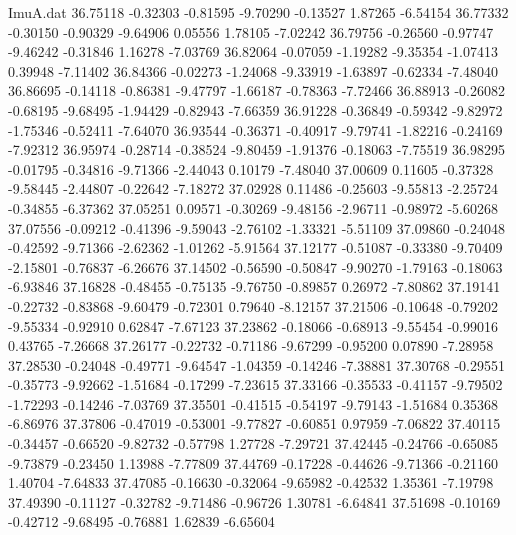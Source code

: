 \begin{filecontents}{ImuA.dat}
  36.75118   -0.32303   -0.81595   -9.70290   -0.13527    1.87265   -6.54154
  36.77332   -0.30150   -0.90329   -9.64906    0.05556    1.78105   -7.02242
  36.79756   -0.26560   -0.97747   -9.46242   -0.31846    1.16278   -7.03769
  36.82064   -0.07059   -1.19282   -9.35354   -1.07413    0.39948   -7.11402
  36.84366   -0.02273   -1.24068   -9.33919   -1.63897   -0.62334   -7.48040
  36.86695   -0.14118   -0.86381   -9.47797   -1.66187   -0.78363   -7.72466
  36.88913   -0.26082   -0.68195   -9.68495   -1.94429   -0.82943   -7.66359
  36.91228   -0.36849   -0.59342   -9.82972   -1.75346   -0.52411   -7.64070
  36.93544   -0.36371   -0.40917   -9.79741   -1.82216   -0.24169   -7.92312
  36.95974   -0.28714   -0.38524   -9.80459   -1.91376   -0.18063   -7.75519
  36.98295   -0.01795   -0.34816   -9.71366   -2.44043    0.10179   -7.48040
  37.00609    0.11605   -0.37328   -9.58445   -2.44807   -0.22642   -7.18272
  37.02928    0.11486   -0.25603   -9.55813   -2.25724   -0.34855   -6.37362
  37.05251    0.09571   -0.30269   -9.48156   -2.96711   -0.98972   -5.60268
  37.07556   -0.09212   -0.41396   -9.59043   -2.76102   -1.33321   -5.51109
  37.09860   -0.24048   -0.42592   -9.71366   -2.62362   -1.01262   -5.91564
  37.12177   -0.51087   -0.33380   -9.70409   -2.15801   -0.76837   -6.26676
  37.14502   -0.56590   -0.50847   -9.90270   -1.79163   -0.18063   -6.93846
  37.16828   -0.48455   -0.75135   -9.76750   -0.89857    0.26972   -7.80862
  37.19141   -0.22732   -0.83868   -9.60479   -0.72301    0.79640   -8.12157
  37.21506   -0.10648   -0.79202   -9.55334   -0.92910    0.62847   -7.67123
  37.23862   -0.18066   -0.68913   -9.55454   -0.99016    0.43765   -7.26668
  37.26177   -0.22732   -0.71186   -9.67299   -0.95200    0.07890   -7.28958
  37.28530   -0.24048   -0.49771   -9.64547   -1.04359   -0.14246   -7.38881
  37.30768   -0.29551   -0.35773   -9.92662   -1.51684   -0.17299   -7.23615
  37.33166   -0.35533   -0.41157   -9.79502   -1.72293   -0.14246   -7.03769
  37.35501   -0.41515   -0.54197   -9.79143   -1.51684    0.35368   -6.86976
  37.37806   -0.47019   -0.53001   -9.77827   -0.60851    0.97959   -7.06822
  37.40115   -0.34457   -0.66520   -9.82732   -0.57798    1.27728   -7.29721
  37.42445   -0.24766   -0.65085   -9.73879   -0.23450    1.13988   -7.77809
  37.44769   -0.17228   -0.44626   -9.71366   -0.21160    1.40704   -7.64833
  37.47085   -0.16630   -0.32064   -9.65982   -0.42532    1.35361   -7.19798
  37.49390   -0.11127   -0.32782   -9.71486   -0.96726    1.30781   -6.64841
  37.51698   -0.10169   -0.42712   -9.68495   -0.76881    1.62839   -6.65604

\end{filecontents}
